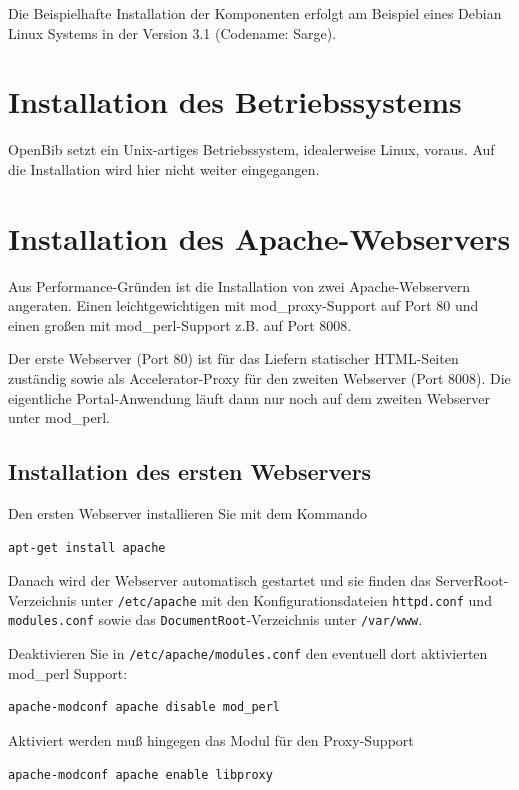 \documentclass[11pt, twoside, a4paper, BCOR8mm, DIV12, bibtotoc,idxtotoc]{scrbook}
\begin{document}
Die Beispielhafte Installation der Komponenten erfolgt am Beispiel
eines Debian Linux Systems in der Version 3.1 (Codename: Sarge).


\section{Installation des Betriebssystems}
OpenBib setzt ein Unix-artiges Betriebssystem, idealerweise Linux,
voraus. Auf die Installation wird hier nicht weiter eingegangen.


\section{Installation des Apache-Webservers}
Aus Performance-Gründen ist die Installation von zwei
Apache-Webservern angeraten. Einen leichtgewichtigen mit
mod\_proxy-Support auf Port 80 und einen großen mit mod\_perl-Support
z.B. auf Port 8008. 

Der erste Webserver (Port 80) ist für das Liefern statischer
HTML-Seiten zuständig sowie als Accelerator-Proxy für den zweiten
Webserver (Port 8008). Die eigentliche Portal-Anwendung läuft dann
nur noch auf dem zweiten Webserver unter mod\_perl.


\subsection{Installation des ersten Webservers}

Den ersten Webserver installieren Sie mit dem Kommando

\begin{verbatim}
apt-get install apache
\end{verbatim}

Danach wird der Webserver automatisch gestartet und sie finden das
ServerRoot-Verzeichnis unter \texttt{/etc/apache} mit den Konfigurationsdateien
\texttt{httpd.conf} und \texttt{modules.conf} sowie das \texttt{DocumentRoot}-Verzeichnis unter
\texttt{/var/www}.

Deaktivieren Sie in \texttt{/etc/apache/modules.conf} den eventuell
dort aktivierten mod\_perl Support:

\begin{verbatim}
apache-modconf apache disable mod_perl
\end{verbatim}

Aktiviert werden muß hingegen das Modul für den Proxy-Support

\begin{verbatim}
apache-modconf apache enable libproxy
\end{verbatim}
\end{document}
